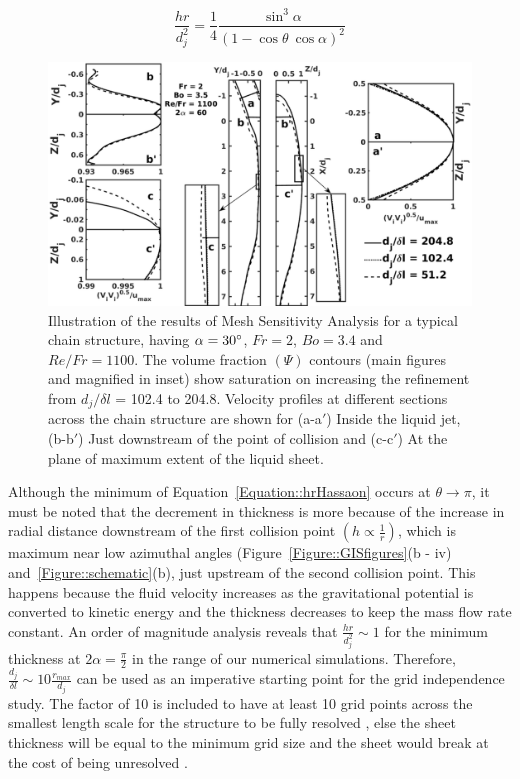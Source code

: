 \documentclass[%
aip,
sd,%
amsmath,amssymb,
preprint,%
author-year,%
]{revtex4-1}
\begin{document}
\begin{equation}\label{Equation::hrHassaon}
\frac{hr}{d_j^2} = 	\frac{1}{4}\frac{\sin^3\alpha}{(1-\cos\theta\:\cos\alpha)^2}
\end{equation}
\begin{figure}
	\centering
	\includegraphics[width=\linewidth]{gis}
	\caption{Illustration of the results of Mesh Sensitivity Analysis for a typical chain structure, having $\alpha = 30\degree$, $Fr = 2$, $Bo = 3.4$ and $Re/Fr = 1100$. The volume fraction $\left(\Psi\right)$ contours (main figures and magnified in inset) show saturation on increasing the refinement from $d_j/\delta l$ = 102.4 to 204.8. Velocity profiles at different sections across the chain structure are shown for (a-a$'$) Inside the liquid jet, (b-b$'$) Just downstream of the point of collision  and (c-c$'$) At the plane of maximum extent of the liquid sheet.}
	\label{Figure::GISplots}
\end{figure}
Although the minimum of Equation~\ref{Equation::hrHassaon} occurs at $\theta \to \pi$, it must be noted that the decrement in thickness is more because of the increase in radial distance downstream of the first collision point $\left(h \propto \frac{1}{r}\right)$, which is maximum near low azimuthal angles (Figure~\ref{Figure::GISfigures}(b - iv) and~\ref{Figure::schematic}(b), just upstream of the second collision point. This happens because the fluid velocity increases as the gravitational potential is converted to kinetic energy and the thickness decreases to keep the mass flow rate constant. An order of magnitude analysis reveals that $\frac{hr}{d_j^2} \sim 1$ for the minimum thickness at $2\alpha = \frac{\pi}{2}$ in the range of our numerical simulations. Therefore, $\frac{d_j}{\delta l} \sim 10\frac{r_{max}}{d_j}$ can be used as an imperative starting point for the grid independence study. The factor of 10 is included to have at least 10 grid points across the smallest length scale for the structure to be fully resolved \citep{ling2015multiscale}, else the sheet thickness will be equal to the minimum grid size and the sheet would break at the cost of being unresolved \citep{chen2013high}.
\end{document}
